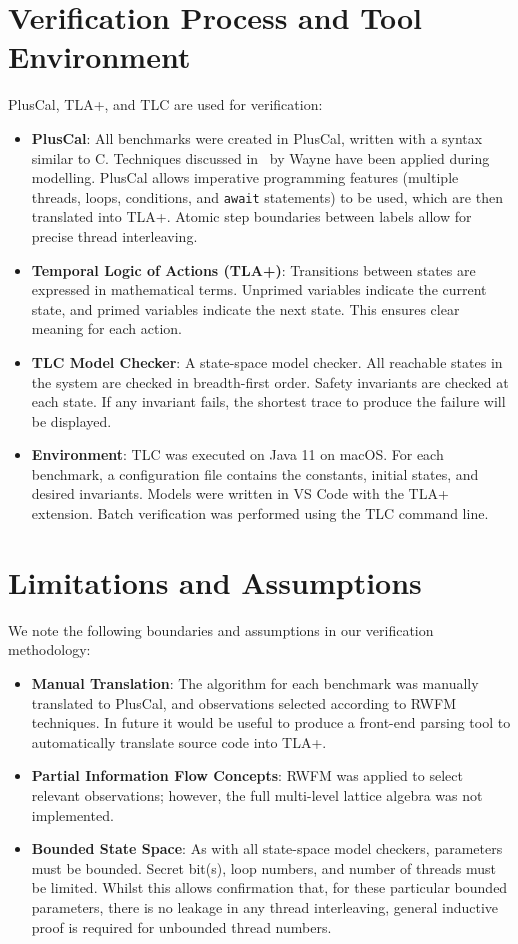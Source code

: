 \documentclass[a4paper,12pt]{report}
\begin{document}
\section{Verification Process and Tool Environment}
PlusCal, TLA+, and TLC are used for verification:
\begin{itemize}[itemsep=0.2em, topsep=0.15em]
    \item \textbf{PlusCal}: All benchmarks were created in PlusCal, written with a syntax similar to C. Techniques discussed in~\cite{wayne2018practical} by Wayne have been applied during modelling. PlusCal allows imperative programming features (multiple threads, loops, conditions, and \texttt{await} statements) to be used, which are then translated into TLA+. Atomic step boundaries between labels allow for precise thread interleaving.
    \item \textbf{Temporal Logic of Actions (TLA+)}: Transitions between states are expressed in mathematical terms. Unprimed variables indicate the current state, and primed variables indicate the next state. This ensures clear meaning for each action.
    \item \textbf{TLC Model Checker}: A state-space model checker. All reachable states in the system are checked in breadth-first order. Safety invariants are checked at each state. If any invariant fails, the shortest trace to produce the failure will be displayed.
    \item \textbf{Environment}: TLC was executed on Java 11 on macOS. For each benchmark, a configuration file contains the constants, initial states, and desired invariants. Models were written in VS Code with the TLA+ extension. Batch verification was performed using the TLC command line.
\end{itemize}

\section{Limitations and Assumptions}
We note the following boundaries and assumptions in our verification methodology:
\begin{itemize}[itemsep=0.2em, topsep=0.15em]
    \item \textbf{Manual Translation}: The algorithm for each benchmark was manually translated to PlusCal, and observations selected according to RWFM techniques. In future it would be useful to produce a front-end parsing tool to automatically translate source code into TLA+.
    \item \textbf{Partial Information Flow Concepts}: RWFM was applied to select relevant observations; however, the full multi-level lattice algebra was not implemented.
    \item \textbf{Bounded State Space}: As with all state-space model checkers, parameters must be bounded. Secret bit(s), loop numbers, and number of threads must be limited. Whilst this allows confirmation that, for these particular bounded parameters, there is no leakage in any thread interleaving, general inductive proof is required for unbounded thread numbers.
\end{itemize}
\end{document}
